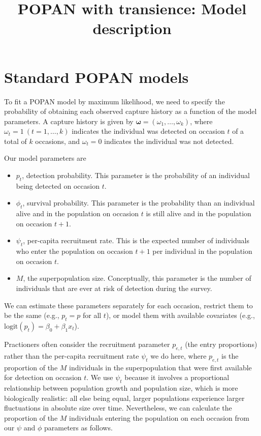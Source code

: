 \documentclass{article}
\title{POPAN with transience: Model description}
\author{}
\date{}
\begin{document}
\maketitle

\section{Standard POPAN models}

To fit a POPAN model by maximum likelihood, we need to specify the
probability of obtaining each observed capture history as a function
of the model parameters. A capture history is given by $\bm{\omega} =
(\omega_1, \ldots, \omega_k)$, where $\omega_t = 1\ (t = 1, \ldots,
k)$ indicates the individual was detected on occasion $t$ of a total
of $k$ occasions, and $\omega_t = 0$ indicates the individual was not
detected.

Our model parameters are
\begin{itemize}
  \item $p_t$, detection probability. This parameter is the
    probability of an individual being detected on occasion $t$.
  \item $\phi_t$, survival probability. This parameter is the
    probability than an individual alive and in the population on
    occasion $t$ is still alive and in the population on occasion $t +
    1$.
  \item $\psi_t$, per-capita recruitment rate. This is the expected
    number of individuals who enter the population on occasion $t +
    1$ per individual in the population on occasion $t$.
  \item $M$, the superpopulation size. Conceptually, this parameter is
    the number of individuals that are ever at risk of detection
    during the survey.
\end{itemize}
We can estimate these parameters separately for each occasion,
restrict them to be the same (e.g., $p_t = p$ for all $t$), or model
them with available covariates (e.g., $\mathrm{logit}(p_t) = \beta_0 +
\beta_1 x_t$).

Practioners often consider the recruitment parameter $p_{e, t}$ (the
entry proportions) rather than the per-capita recruitment rate
$\psi_t$ we do here, where $p_{e, t}$ is the proportion of the $M$
individuals in the superpopulation that were first available for
detection on occasion $t$. We use $\psi_t$ because it involves a
proportional relationship between population growth and population
size, which is more biologically realistic: all else being equal,
larger populations experience larger fluctuations in absolute size
over time. Nevertheless, we can calculate the proportion of the $M$
individuals entering the population on each occasion from our $\psi$
and $\phi$ parameters as follows.
\end{document}
